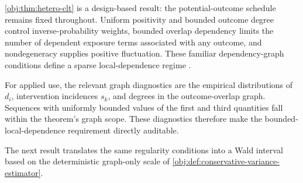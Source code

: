 \cref{obj:thm:hetero-clt} is a design-based result: the potential-outcome schedule remains fixed throughout. Uniform positivity and bounded outcome degree control inverse-probability weights, bounded overlap dependency limits the number of dependent exposure terms associated with any outcome, and nondegeneracy supplies positive fluctuation. These familiar dependency-graph conditions define a sparse local-dependence regime \citep{AronowSamii2017GeneralInterference,LuShiFangZhangDing2025BipartiteDesign}.

For applied use, the relevant graph diagnostics are the empirical distributions of \(d_i\), intervention incidences \(s_k\), and degrees in the outcome-overlap graph. Sequences with uniformly bounded values of the first and third quantities fall within the theorem's graph scope. These diagnostics therefore make the bounded-local-dependence requirement directly auditable.

The next result translates the same regularity conditions into a Wald interval based on the deterministic graph-only scale of \cref{obj:def:conservative-variance-estimator}.

